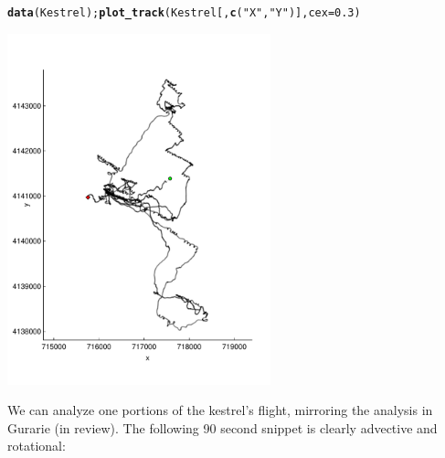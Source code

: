 \documentclass[10pt]{article}\usepackage[]{graphicx}\usepackage[]{color}
\makeatletter
\newcommand{\hlnum}[1]{\textcolor[rgb]{0.686,0.059,0.569}{#1}}%
\newcommand{\hlstr}[1]{\textcolor[rgb]{0.192,0.494,0.8}{#1}}%
\newcommand{\hlstd}[1]{\textcolor[rgb]{0.345,0.345,0.345}{#1}}%
\newcommand{\hlkwc}[1]{\textcolor[rgb]{0.333,0.667,0.333}{#1}}%
\newcommand{\hlkwd}[1]{\textcolor[rgb]{0.737,0.353,0.396}{\textbf{#1}}}%
\newenvironment{kframe}{%
 \def\at@end@of@kframe{}%
 \ifinner\ifhmode%
  \def\at@end@of@kframe{\end{minipage}}%
  \begin{minipage}{\columnwidth}%
 \fi\fi%
 \def\FrameCommand##1{\hskip\@totalleftmargin \hskip-\fboxsep
 \colorbox{shadecolor}{##1}\hskip-\fboxsep
     \hskip-\linewidth \hskip-\@totalleftmargin \hskip\columnwidth}%
 \MakeFramed {\advance\hsize-\width
   \@totalleftmargin\z@ \linewidth\hsize
   \@setminipage}}%
 {\par\unskip\endMakeFramed%
 \at@end@of@kframe}
\newenvironment{knitrout}{}{} %
\makeatother
\begin{document}
\begin{knitrout}
\color{fgcolor}\begin{kframe}
\begin{alltt}
\hlkwd{data}\hlstd{(Kestrel);} \hlkwd{plot_track}\hlstd{(Kestrel[,}\hlkwd{c}\hlstd{(}\hlstr{"X"}\hlstd{,}\hlstr{"Y"}\hlstd{)],} \hlkwc{cex}\hlstd{=}\hlnum{0.3}\hlstd{)}
\end{alltt}
\end{kframe}

{\centering \includegraphics[width=3in]{figure/KestrelFlight-1} 

}



\end{knitrout}


\noindent We can analyze one portions of the kestrel's flight, mirroring the analysis in Gurarie (in review).  The following 90 second snippet is clearly advective and rotational:
\end{document}
